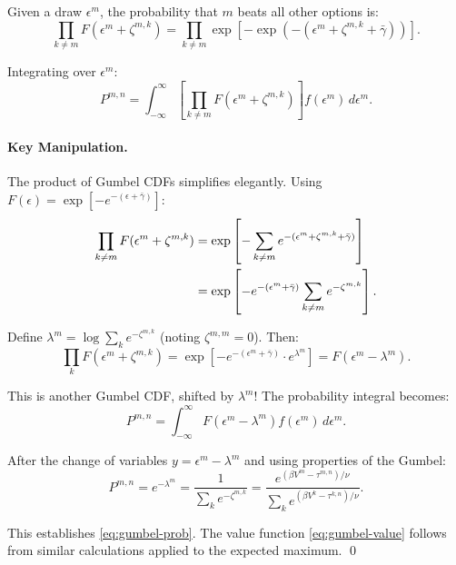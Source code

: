 Given a draw $\epsilon^m$, the probability that $m$ beats all other options is:
\begin{equation}
\prod_{k \neq m} F(\epsilon^m + \zeta^{m,k}) = \prod_{k \neq m} \exp\left[ -\exp\left( -(\epsilon^m + \zeta^{m,k} + \bar{\gamma}) \right) \right].
\end{equation}

Integrating over $\epsilon^m$:
\begin{equation}
P^{m,n} = \int_{-\infty}^{\infty} \left[ \prod_{k \neq m} F(\epsilon^m + \zeta^{m,k}) \right] f(\epsilon^m) \, d\epsilon^m.
\end{equation}

\paragraph{Key Manipulation.}

The product of Gumbel CDFs simplifies elegantly. Using $F(\epsilon) = \exp[-e^{-(\epsilon + \bar{\gamma})}]$:
\begin{align}
\prod_{k \neq m} F(\epsilon^m + \zeta^{m,k}) &= \exp\left[ -\sum_{k \neq m} e^{-(\epsilon^m + \zeta^{m,k} + \bar{\gamma})} \right] \notag \\
&= \exp\left[ -e^{-(\epsilon^m + \bar{\gamma})} \sum_{k \neq m} e^{-\zeta^{m,k}} \right].
\end{align}

Define $\lambda^m = \log \sum_k e^{-\zeta^{m,k}}$ (noting $\zeta^{m,m} = 0$). Then:
\begin{equation}
\prod_k F(\epsilon^m + \zeta^{m,k}) = \exp\left[ -e^{-(\epsilon^m + \bar{\gamma})} \cdot e^{\lambda^m} \right] = F(\epsilon^m - \lambda^m).
\end{equation}

This is another Gumbel CDF, shifted by $\lambda^m$! The probability integral becomes:
\begin{equation}
P^{m,n} = \int_{-\infty}^{\infty} F(\epsilon^m - \lambda^m) f(\epsilon^m) \, d\epsilon^m.
\end{equation}

After the change of variables $y = \epsilon^m - \lambda^m$ and using properties of the Gumbel:
\begin{equation}
P^{m,n} = e^{-\lambda^m} = \frac{1}{\sum_k e^{-\zeta^{m,k}}} = \frac{e^{(\beta V^m - \tau^{m,n})/\nu}}{\sum_k e^{(\beta V^k - \tau^{k,n})/\nu}}.
\end{equation}

This establishes \eqref{eq:gumbel-prob}. The value function \eqref{eq:gumbel-value} follows from similar calculations applied to the expected maximum. \qed

